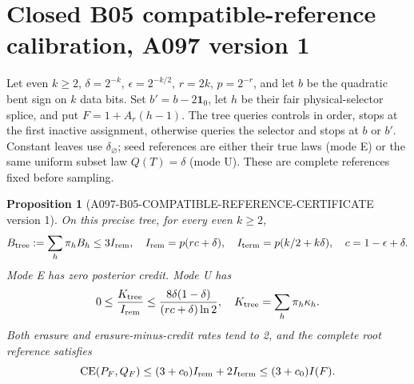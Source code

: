 \documentclass[11pt]{article}
\newtheorem{proposition}[lemma]{Proposition}
\newcommand{\CE}{\operatorname{CE}}
\begin{document}
\section{Closed B05 compatible-reference calibration, A097 version 1}
\label{sec:b05ref}
Let even $k\ge2$, $\delta=2^{-k}$, $\epsilon=2^{-k/2}$,
$r=2k$, $p=2^{-r}$, and let $b$ be the quadratic bent sign
on $k$ data bits. Set $b'=b-2\mathbf1_0$, let $h$ be their fair
physical-selector splice, and put $F=1+A_r(h-1)$.
The tree queries controls in order, stops at the first inactive
assignment, otherwise queries the selector and stops at $b$ or $b'$.
Constant leaves use $\delta_\varnothing$; seed references are either
their true laws (mode E) or the same uniform subset law $Q(T)=\delta$
(mode U). These are complete references fixed before sampling.
\begin{proposition}[A097-B05-COMPATIBLE-REFERENCE-CERTIFICATE version 1]
\label{prop:b05ref}
On this precise tree, for every even $k\ge2$,
\[
 B_{\rm tree}:=\sum_h\pi_hB_h\le3 I_{\rm rem},\quad
 I_{\rm rem}=p(rc+\delta),\quad I_{\rm term}=p(k/2+k\delta),
 \quad c=1-\epsilon+\delta.
\]
Mode E has zero posterior credit. Mode U has
\[
0\le\frac{K_{\rm tree}}{I_{\rm rem}}
\le\frac{8\delta(1-\delta)}{(rc+\delta)\ln2},
\quad K_{\rm tree}=\sum_h\pi_h\kappa_h.
\]
Both erasure and erasure-minus-credit rates tend to 2, and
the complete root reference satisfies
\[
\CE(P_F,Q_F)\le(3+c_0)I_{\rm rem}+2I_{\rm term}
\le(3+c_0)I(F).
\]
\end{proposition}
\end{document}
